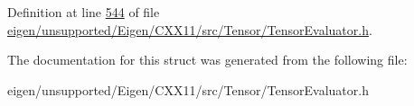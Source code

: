 Definition at line \hyperlink{eigen_2unsupported_2_eigen_2_c_x_x11_2src_2_tensor_2_tensor_evaluator_8h_source_l00544}{544} of file \hyperlink{eigen_2unsupported_2_eigen_2_c_x_x11_2src_2_tensor_2_tensor_evaluator_8h_source}{eigen/unsupported/\+Eigen/\+C\+X\+X11/src/\+Tensor/\+Tensor\+Evaluator.\+h}.



The documentation for this struct was generated from the following file\+:\begin{DoxyCompactItemize}
\item 
eigen/unsupported/\+Eigen/\+C\+X\+X11/src/\+Tensor/\+Tensor\+Evaluator.\+h\end{DoxyCompactItemize}
